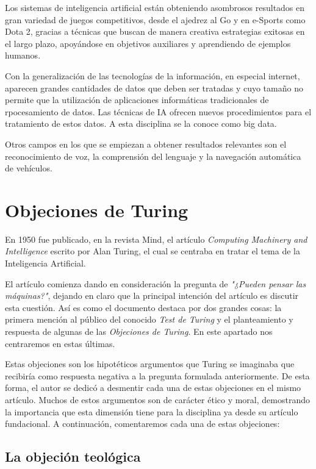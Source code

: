 \documentclass[12pt,a4paper]{article}
\begin{document}
Los sistemas de inteligencia artificial están obteniendo asombrosos resultados en gran variedad de juegos competitivos, desde el ajedrez al Go y en e-Sports como Dota 2, gracias a técnicas que buscan de manera creativa estrategias exitosas en el largo plazo, apoyándose en objetivos auxiliares y aprendiendo de ejemplos humanos.

Con la generalización de las tecnologías de la información, en especial internet, aparecen grandes cantidades de datos que deben ser tratadas y cuyo tamaño no permite que la utilización de aplicaciones informáticas tradicionales de rpocesamiento de datos. Las técnicas de IA ofrecen nuevos procedimientos para el tratamiento de estos datos. A esta disciplina se la conoce como big data.

Otros campos en los que se empiezan a obtener resultados relevantes son el reconocimiento de voz, la comprensión del lenguaje y la navegación automática de vehículos.

\section{Objeciones de Turing}
En 1950 fue publicado, en la revista Mind, el artículo \emph{Computing Machinery and Intelligence} \cite{Turing} escrito por Alan Turing, el cual se centraba en tratar el tema de la Inteligencia Artificial.

El artículo comienza dando en consideración la pregunta de \emph{"¿Pueden pensar las máquinas?"}, dejando en claro que la principal intención del artículo es discutir esta cuestión. Así es como el documento destaca por dos grandes cosas: la primera mención al público del conocido \emph{Test de Turing} y el planteamiento y respuesta de algunas de las \emph{Objeciones de Turing}. En este apartado nos centraremos en estas últimas.

Estas objeciones son los hipotéticos argumentos que Turing se imaginaba que recibiría como respuesta negativa a la pregunta formulada anteriormente. De esta forma, el autor se dedicó a desmentir cada una de estas objeciones en el mismo artículo. Muchos de estos argumentos son de carácter ético y moral, demostrando la importancia que esta dimensión tiene para la disciplina ya desde su artículo fundacional. A continuación, comentaremos cada una de estas objeciones:

\subsection{La objeción teológica}
\end{document}
